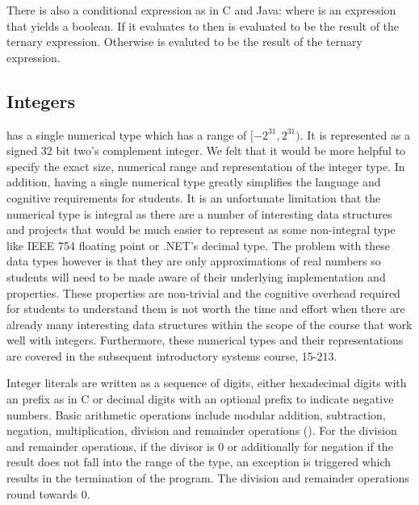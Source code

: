 There is also a conditional expression as in C and Java: 
where  is an expression that yields a boolean. If it evaluates to
 then  is evaluated to be the result of the ternary
expression. Otherwise  is evaluted to be the result of the ternary
expression.

\subsection{Integers}

\langname{} has a single numerical type  which has a range of
$[-2^{31},2^{31})$. It is represented as a signed 32 bit two's complement
integer. We felt that it would be more helpful to specify the exact size,
numerical range and representation of the integer type.  In addition, having a
single numerical type greatly simplifies the language and cognitive requirements
for students. It is an unfortunate limitation that the numerical type is
integral as there are a number of interesting data structures and projects that
would be much easier to represent as some non-integral type like IEEE 754
floating point or .NET's decimal type.  The problem with these data types
however is that they are only approximations of real numbers so students will
need to be made aware of their underlying implementation and properties.  These
properties are non-trivial and the cognitive overhead required for students to
understand them is not worth the time and effort when there are already many
interesting data structures within the scope of the course that work well with
integers. Furthermore, these numerical types and their representations are
covered in the subsequent introductory systems course, 15-213.

Integer literals are written as a sequence of digits, either hexadecimal digits
with an  prefix as in C or decimal digits with an optional
\langtext{-} prefix to indicate negative numbers. Basic arithmetic operations
include modular addition, subtraction, negation, multiplication, division and
remainder operations (\langtext{+ - * / \%}). For the division and remainder
operations, if the divisor is 0 or additionally for
negation if the result does not fall into the range of the  type,
an exception is triggered which results in the termination of the program. The
division and remainder operations round towards 0.

\grammarbegin
{}

